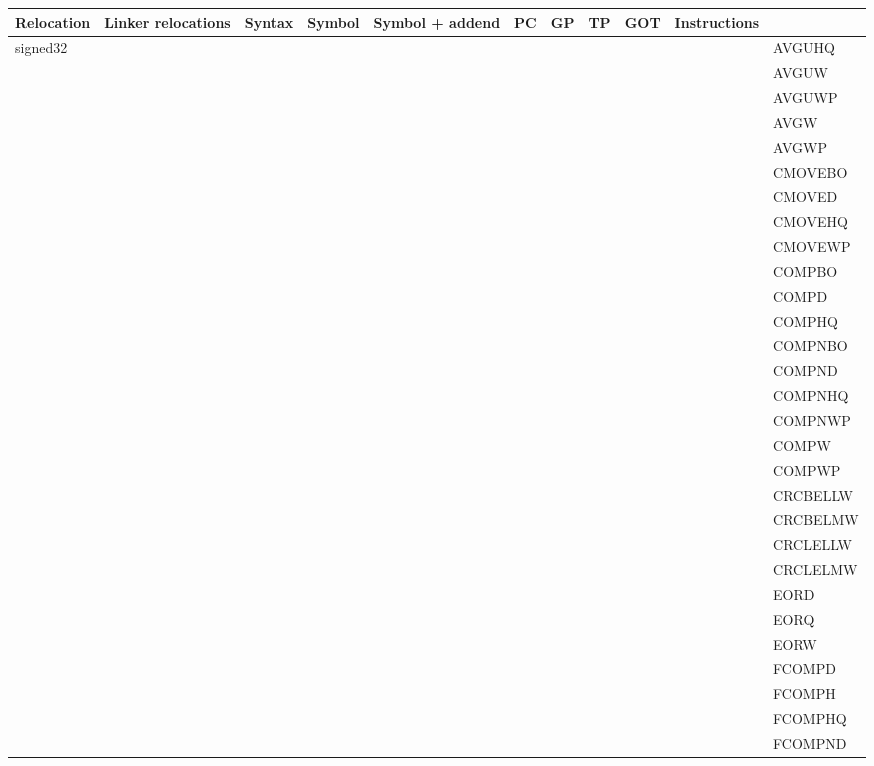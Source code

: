 {\tiny
\begin{tabular}{|l|l|l|l|l|l|l|l|l|l|l|} \hline
\textsf{Relocation} & \textsf{Linker relocations} & \textsf{Syntax} & \textsf{Symbol} & \textsf{Symbol + addend} & \textsf{PC} & \textsf{GP} & \textsf{TP} & \textsf{GOT} & \textsf{Instructions} \\
\hline
\textsf{signed32} & & & & & & & & & & \textsf{AVGUHQ} \\
 & & & & & & & & & & \textsf{AVGUW} \\
 & & & & & & & & & & \textsf{AVGUWP} \\
 & & & & & & & & & & \textsf{AVGW} \\
 & & & & & & & & & & \textsf{AVGWP} \\
 & & & & & & & & & & \textsf{CMOVEBO} \\
 & & & & & & & & & & \textsf{CMOVED} \\
 & & & & & & & & & & \textsf{CMOVEHQ} \\
 & & & & & & & & & & \textsf{CMOVEWP} \\
 & & & & & & & & & & \textsf{COMPBO} \\
 & & & & & & & & & & \textsf{COMPD} \\
 & & & & & & & & & & \textsf{COMPHQ} \\
 & & & & & & & & & & \textsf{COMPNBO} \\
 & & & & & & & & & & \textsf{COMPND} \\
 & & & & & & & & & & \textsf{COMPNHQ} \\
 & & & & & & & & & & \textsf{COMPNWP} \\
 & & & & & & & & & & \textsf{COMPW} \\
 & & & & & & & & & & \textsf{COMPWP} \\
 & & & & & & & & & & \textsf{CRCBELLW} \\
 & & & & & & & & & & \textsf{CRCBELMW} \\
 & & & & & & & & & & \textsf{CRCLELLW} \\
 & & & & & & & & & & \textsf{CRCLELMW} \\
 & & & & & & & & & & \textsf{EORD} \\
 & & & & & & & & & & \textsf{EORQ} \\
 & & & & & & & & & & \textsf{EORW} \\
 & & & & & & & & & & \textsf{FCOMPD} \\
 & & & & & & & & & & \textsf{FCOMPH} \\
 & & & & & & & & & & \textsf{FCOMPHQ} \\
 & & & & & & & & & & \textsf{FCOMPND} \\

\end{tabular}}
